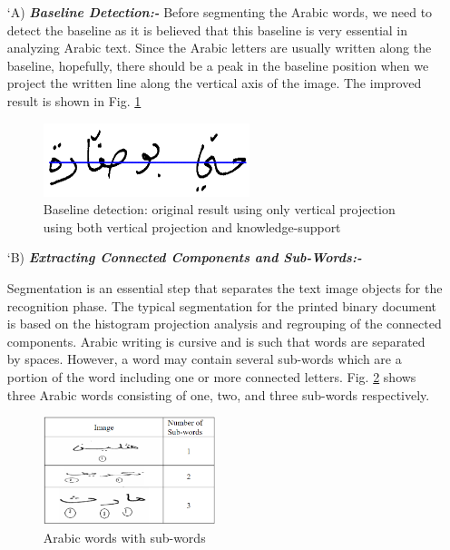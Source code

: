 \begin{itemize}[labelindent=1em,labelsep=0.25cm,leftmargin=*]
        \item[\char `A)] \textit{\textbf{Baseline Detection:-}} 
        Before  segmenting  the  Arabic  words,  we  need  to detect  the  baseline  as  it  is  believed  that  this  baseline  is  very  essential  in  analyzing  Arabic  text.  Since  the  Arabic  letters  are  usually written along the baseline, hopefully, there should be a peak in the baseline position when we project the written line along the vertical axis of the image.
        The  improved result is shown in Fig. \ref{fig:basline}
 
         \begin{figure}[!htb]
            \centering
            \includegraphics[width=6cm]{images/basline.png}
            \caption{Baseline detection: original result using only vertical projection using both vertical projection and knowledge-support}
            \label{fig:basline}
        \end{figure}
        
        \item[\char `B)] \textit{\textbf{Extracting Connected Components and Sub-Words:-}}  
        
        Segmentation is an essential step that separates the text image objects for the recognition phase. The typical segmentation for the printed binary document is based on the histogram projection analysis and regrouping of the connected components. Arabic writing is cursive  and is such that words are separated by spaces. However,  a  word may contain several sub-words which are a portion  of  the  word including one or more connected letters.
Fig. \ref{fig:subword} shows three Arabic words consisting of one, two, and three sub-words respectively. 

 \begin{figure}[!htb]
    \centering
    \includegraphics[width=5cm]{images/subword.png}
    \caption{Arabic words with sub-words}
    \label{fig:subword}
\end{figure}


\end{itemize}
